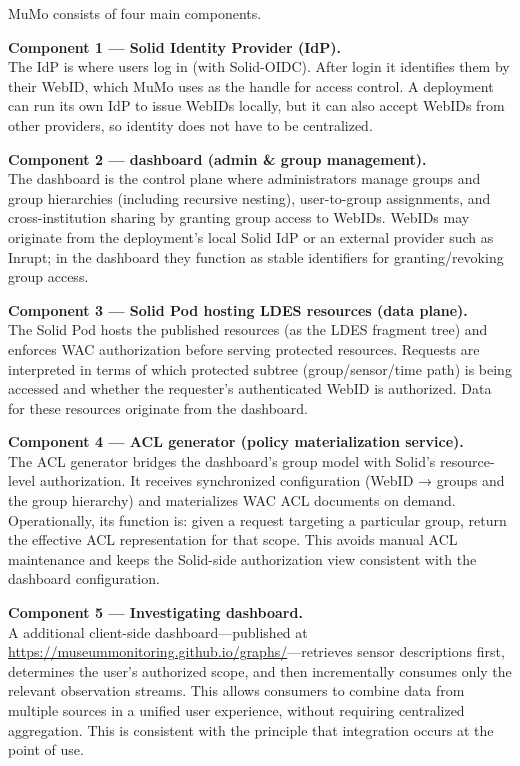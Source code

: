 \documentclass{ceurart}
\begin{document}
MuMo consists of four main components.

\textbf{Component 1 --- Solid Identity Provider (IdP).}\\
The IdP is where users log in (with Solid-OIDC). After login it
identifies them by their WebID, which MuMo uses as the handle for access
control. A deployment can run its own IdP to issue WebIDs locally, but
it can also accept WebIDs from other providers, so identity does not
have to be centralized.

\textbf{Component 2 --- dashboard (admin \& group management).}\\
The dashboard is the control plane where administrators manage groups
and group hierarchies (including recursive nesting), user-to-group
assignments, and cross-institution sharing by granting group access to
WebIDs. WebIDs may originate from the deployment's local Solid IdP or an
external provider such as Inrupt; in the dashboard they function as
stable identifiers for granting/revoking group access.

\textbf{Component 3 --- Solid Pod hosting LDES resources (data
plane).}\\
The Solid Pod hosts the published resources (as the LDES fragment tree)
and enforces WAC authorization before serving protected resources.
Requests are interpreted in terms of which protected subtree
(group/sensor/time path) is being accessed and whether the requester's
authenticated WebID is authorized. Data for these resources originate
from the dashboard.

\textbf{Component 4 --- ACL generator (policy materialization
service).}\\
The ACL generator bridges the dashboard's group model with Solid's
resource-level authorization. It receives synchronized configuration
(WebID → groups and the group hierarchy) and materializes WAC ACL
documents on demand. Operationally, its function is: given a request
targeting a particular group, return the effective ACL representation
for that scope. This avoids manual ACL maintenance and keeps the
Solid-side authorization view consistent with the dashboard
configuration.

\textbf{Component 5 --- Investigating dashboard.}\\
A additional client-side dashboard---published at
\url{https://museummonitoring.github.io/graphs/}---retrieves sensor
descriptions first, determines the user's authorized scope, and then
incrementally consumes only the relevant observation streams. This
allows consumers to combine data from multiple sources in a unified user
experience, without requiring centralized aggregation. This is
consistent with the principle that integration occurs at the point of
use.
\end{document}
